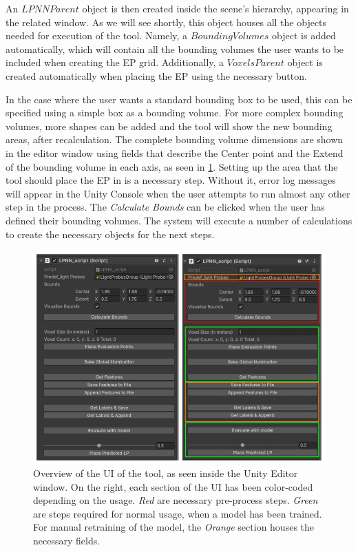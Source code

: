 An $LPNN Parent$ object is then created inside the scene's hierarchy, appearing in the related window. As we will see shortly, this object houses all the objects needed for execution of the tool. Namely, a $BoundingVolumes$ object is added automatically, which will contain all the bounding volumes the user wants to be included when creating the EP grid. Additionally, a $VoxelsParent$ object is created automatically when placing the EP using the necessary button. 

In the case where the user wants a standard bounding box to be used, this can be specified using a simple box as a bounding volume. For more complex bounding volumes, more shapes can be added and the tool will show the new bounding areas, after recalculation. The complete bounding volume dimensions are shown in the editor window using fields that describe the Center point and the Extend of the bounding volume in each axis, as seen in \ref{fig:UI_editor}. Setting up the area that the tool should place the EP in is a necessary step. Without it, error log messages will appear in the Unity Console when the user attempts to run almost any other step in the process. The \textit{Calculate Bounds} can be clicked when the user has defined their bounding volumes. The system will execute a number of calculations to create the necessary objects for the next steps.\newline

\begin{figure}[h]
	\centering
	\includegraphics[scale=0.53]{Graphics/UI_parent_combined.png}
	\caption{Overview of the UI of the tool, as seen inside the Unity Editor window. On the right, each section of the UI has been color-coded depending on the usage. \textit{Red} are necessary pre-process steps. \textit{Green} are steps required for normal usage, when a model has been trained. For manual retraining of the model, the \textit{Orange} section houses the necessary fields.}
	\label{fig:UI_editor}
\end{figure}


